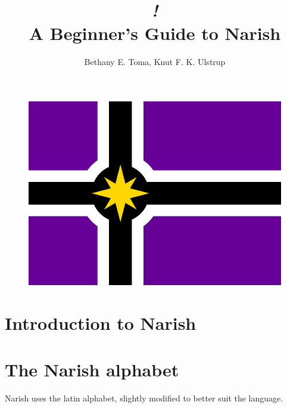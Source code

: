 \documentclass[a5paper,10pt,twoside,openright]{memoir}
\title{{\fontsize{70}{70}\selectfont \itshape \famword{i}{f}{aa}{m}{ak}!} \\ \fontsize{25}{30} \sffamily A Beginner's Guide to Narish}
\author{Bethany E. Toma, Knut F. K. Ulstrup}
\date{}%
\begin{document}
\begin{titlingpage}
    \maketitle
    \begin{figure}[ht]
        \includegraphics[width=\textwidth]{nareland3small.png}
    \end{figure}
\end{titlingpage}

\frontmatter

\newpage

\tableofcontents

\mainmatter

\chapter{Introduction to Narish}

\chapter{The Narish alphabet}

Narish uses the latin alphabet, slightly modified to better suit the language.
\end{document}
